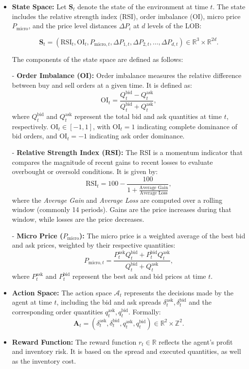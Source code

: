 \begin{itemize}
	\item \textbf{State Space:} Let \( \mathbf{S}_t \) denote the state of the environment at time \( t \). The state includes the relative strength index (RSI), order imbalance (OI), micro price \( P_{\text{micro}} \), and the price level distances \( \Delta P_i \) at \( d \) levels of the LOB:
	
	$$
	\mathbf{S}_t = \left( \text{RSI}_t, \text{OI}_t, P_{\text{micro},t}, \Delta P_{1,t}, \Delta P_{2,t}, \dots, \Delta P_{d,t} \right) \in \mathbb{R}^3 \times \mathbb{R}^{2d}.
	$$
	
	The components of the state space are defined as follows:
	
	- \textbf{Order Imbalance (OI):} Order imbalance measures the relative difference between buy and sell orders at a given time. It is defined as:
	$$
	\text{OI}_t = \frac{Q_t^{\text{bid}} - Q_t^{\text{ask}}}{Q_t^{\text{bid}} + Q_t^{\text{ask}}},
	$$
	where \( Q_t^{\text{bid}} \) and \( Q_t^{\text{ask}} \) represent the total bid and ask quantities at time \( t \), respectively. \( \text{OI}_t \in [-1, 1] \), with \( \text{OI}_t = 1 \) indicating complete dominance of bid orders, and \( \text{OI}_t = -1 \) indicating ask order dominance.
	
	- \textbf{Relative Strength Index (RSI):} The RSI is a momentum indicator that compares the magnitude of recent gains to recent losses to evaluate overbought or oversold conditions. It is given by:
	$$
	\text{RSI}_t = 100 - \frac{100}{1 + \frac{\text{Average Gain}}{\text{Average Loss}}},
	$$
	where the \textit{Average Gain} and \textit{Average Loss} are computed over a rolling window (commonly 14 periods). Gains are the price increases during that window, while losses are the price decreases.
	
	- \textbf{Micro Price (\( P_{\text{micro}} \)):} The micro price is a weighted average of the best bid and ask prices, weighted by their respective quantities:
	$$
	P_{\text{micro},t} = \frac{P_t^{\text{ask}} Q_t^{\text{bid}} + P_t^{\text{bid}} Q_t^{\text{ask}}}{Q_t^{\text{bid}} + Q_t^{\text{ask}}},
	$$
	where \( P_t^{\text{ask}} \) and \( P_t^{\text{bid}} \) represent the best ask and bid prices at time \( t \).
	
	\item \textbf{Action Space:} The action space \( \mathcal{A}_t \) represents the decisions made by the agent at time \( t \), including the bid and ask spreads \( \delta_t^{\text{ask}}, \delta_t^{\text{bid}} \) and the corresponding order quantities \( q_t^{\text{ask}}, q_t^{\text{bid}} \). Formally:
	$$
	\mathbf{A}_t = \left( \delta_t^{\text{ask}}, \delta_t^{\text{bid}}, q_t^{\text{ask}}, q_t^{\text{bid}} \right) \in \mathbb{R}^2 \times \mathbb{Z}^2.
	$$
	
	\item \textbf{Reward Function:} The reward function \( r_t \in \mathbb{R} \) reflects the agent's profit and inventory risk. It is based on the spread and executed quantities, as well as the inventory cost.
\end{itemize}

